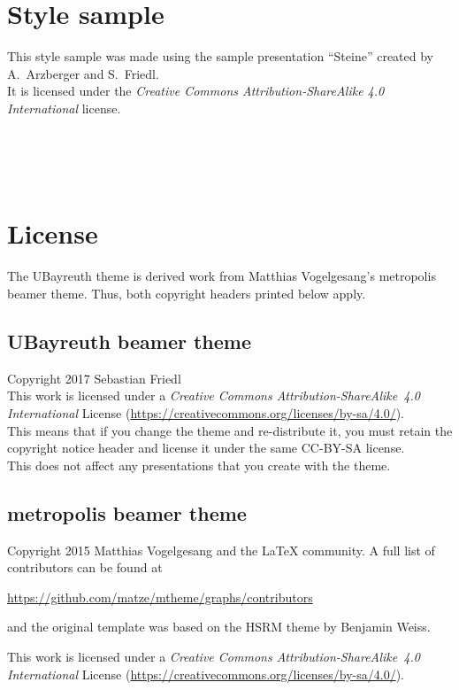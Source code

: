 \documentclass[12pt,a4paper]{scrartcl}
\begin{document}
	\section{Style sample}
	This style sample was made using the sample presentation \enquote{Steine} created by A.~Arzberger and S.~Friedl. \\
	It is licensed under the \textit{Creative Commons Attribution-ShareAlike 4.0 International} license.
	\begin{center}
		  \\
		  \\
		  \\
		 
	\end{center}

	
	\section{License}
	The UBayreuth theme is derived work from Matthias Vogelgesang's metropolis beamer theme. Thus, both copyright headers printed below apply.
	
	\subsection*{UBayreuth beamer theme}
	Copyright 2017 Sebastian Friedl \\
	This work is licensed under a \textit{Creative Commons Attribution-ShareAlike~4.0 International} License (\url{https://creativecommons.org/licenses/by-sa/4.0/}). \\
	This means that if you change the theme and re-distribute it, you must retain the copyright notice header and license it under the same CC-BY-SA license. \\
	This does not affect any presentations that you create with the theme.
	
	\subsection*{metropolis beamer theme}
	Copyright 2015 Matthias Vogelgesang and the LaTeX community. A full list of contributors can be found at
	\begin{center}
		\url{https://github.com/matze/mtheme/graphs/contributors}
	\end{center}
	and the original template was based on the HSRM theme by Benjamin Weiss.

	This work is licensed under a \textit{Creative Commons Attribution-ShareAlike~4.0 International} License (\url{https://creativecommons.org/licenses/by-sa/4.0/}).
\end{document}
